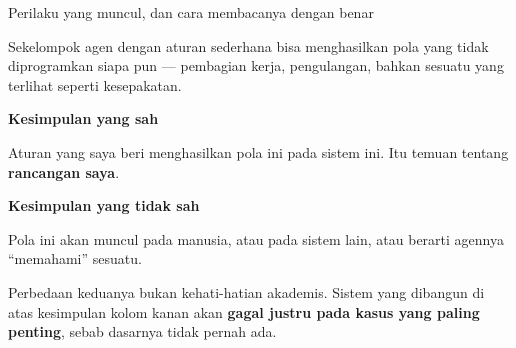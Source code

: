 \documentclass[aspectratio=169,11pt,t]{beamer}
\begin{document}
\begin{frame}[shrink=25]{Perilaku yang muncul, dan cara membacanya dengan benar}
{\fontsize{9.4}{12.6}\selectfont\color{fg2}Sekelompok agen dengan aturan sederhana bisa menghasilkan pola yang tidak diprogramkan siapa pun --- pembagian kerja, pengulangan, bahkan sesuatu yang terlihat seperti kesepakatan.\par}\vskip 4pt
\begin{minipage}[t]{0.485\textwidth}
{\fontsize{9.4}{12.6}\selectfont\color{fg2}\textbf{Kesimpulan yang sah}\par}\vskip 4pt
{\fontsize{9.4}{12.6}\selectfont\color{fg2}Aturan yang saya beri menghasilkan pola ini pada sistem ini. Itu temuan tentang \textbf{rancangan saya}.\par}\vskip 4pt

\end{minipage}%
\hfill
\begin{minipage}[t]{0.485\textwidth}
{\fontsize{9.4}{12.6}\selectfont\color{fg2}\textbf{Kesimpulan yang tidak sah}\par}\vskip 4pt
{\fontsize{9.4}{12.6}\selectfont\color{fg2}Pola ini akan muncul pada manusia, atau pada sistem lain, atau berarti agennya ``memahami'' sesuatu.\par}\vskip 4pt

\end{minipage}%
\begin{iband}[signal]
Perbedaan keduanya bukan kehati-hatian akademis. Sistem yang dibangun di atas kesimpulan kolom kanan akan \textbf{gagal justru pada kasus yang paling penting}, sebab dasarnya tidak pernah ada.
\end{iband}
\end{frame}

\end{document}
